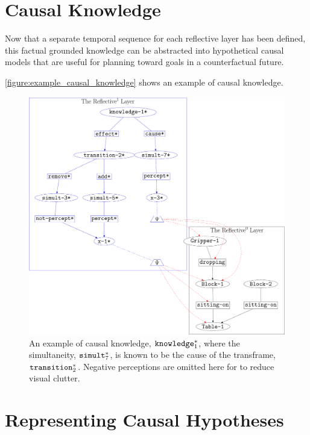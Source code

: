 \section{Causal Knowledge}

Now that a separate temporal sequence for each reflective layer has
been defined, this factual grounded knowledge can be abstracted into
hypothetical causal models that are useful for planning toward goals
in a counterfactual future.



{\mbox{\autoref{figure:example_causal_knowledge}}} shows an example of
causal knowledge.
\begin{figure}
\center
\includegraphics[width=12cm]{gfx/example_causal_knowledge}
\caption[An example of a causal knowledge.]{An example of causal
  knowledge, $\text{\tt{knowledge}}_1^*$, where the simultaneity,
  $\text{\tt{simult}}_7^*$, is known to be the cause of the
  transframe, $\text{\tt{transition}}_2^*$.  Negative perceptions are
  omitted here for to reduce visual clutter.}
\label{figure:example_causal_knowledge}
\end{figure}

\section{Representing Causal Hypotheses}

